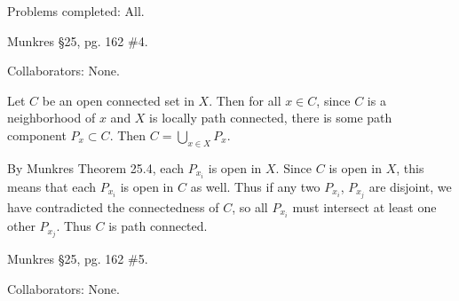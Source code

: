 \documentclass[10pt]{report}
\begin{document}

\renewcommand{\theenumi}{\alph{enumi}}

{\color{blue}Problems completed: All.}

\begin{exer}[]
Munkres \S 25, pg. 162 \#4.
\end{exer}
{\color{blue}Collaborators: None.}

Let $C$ be an open connected set in $X$. Then for all $x \in C$, since $C$ is a neighborhood of $x$ and $X$ is locally path connected, there is some path component $P_{x} \subset C$. Then $C = \bigcup_{x \in X}P_{x}$.

By Munkres Theorem 25.4, each $P_{x_i}$ is open in $X$. Since $C$ is open in $X$, this means that each $P_{x_i}$ is open in $C$ as well. Thus if any two $P_{x_i}$, $P_{x_j}$ are disjoint, we have contradicted the connectedness of $C$, so all $P_{x_i}$ must intersect at least one other $P_{x_j}$. Thus $C$ is path connected.

\begin{exer}[]
Munkres \S 25, pg. 162 \#5.
\end{exer}
{\color{blue}Collaborators: None.}
\end{document}
